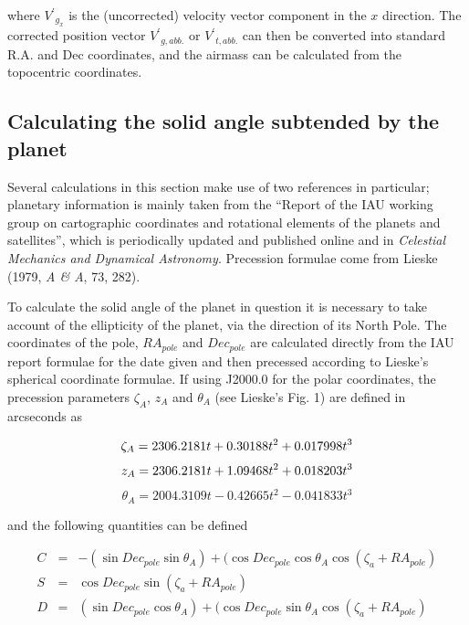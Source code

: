 \documentclass[11pt,twoside]{starlink}
\begin{document}
where ${V^\prime}_{g_{\dot{x}}}$ is the (uncorrected) velocity vector component in the $x$ direction.  The corrected position vector ${V^\prime}_{g, abb.}$ or ${V^\prime}_{t, abb.}$ can then be converted into standard R.A. and Dec coordinates, and the airmass can be calculated from the topocentric coordinates.

\subsection{Calculating the solid angle subtended by the planet}
\label{sec:solidangle}

Several calculations in this section make use of two references in particular; planetary information is mainly taken from the ``Report of the IAU working group on cartographic coordinates and rotational elements of the planets and satellites'', which is periodically updated and published online and in \emph{Celestial Mechanics and Dynamical Astronomy}.  Precession formulae come from Lieske (1979, \textit{A \& A}, 73, 282).

To calculate the solid angle of the planet in question it is necessary to take account of the ellipticity of the planet, via the direction of its North Pole.  The coordinates of the pole, $RA_{pole}$ and $Dec_{pole}$ are calculated directly from the IAU report formulae for the date given and then precessed according to Lieske's spherical coordinate formulae.  If using J2000.0 for the polar coordinates, the precession parameters $\zeta_A$, $z_A$ and $\theta_A$ (see Lieske's Fig. 1) are defined in arcseconds as

\begin{displaymath}
\zeta_A = 2306.2181 t + 0.30188 {t^2} + 0.017998 {t^3}\\
\end{displaymath}
\begin{displaymath}
z_A = 2306.2181 t + 1.09468 {t^2} + 0.018203 {t^3}\\
\end{displaymath}
\begin{displaymath}
\theta_A = 2004.3109 t - 0.42665 {t^2} - 0.041833 {t^3}
\end{displaymath}

and the following quantities can be defined

\begin{eqnarray*}
C & = & -(\sin Dec_{pole} \sin \theta_A) + (\cos Dec_{pole} \cos \theta_A \cos (\zeta_a + RA_{pole})\\
S & = & \cos Dec_{pole} \sin (\zeta_a + RA_{pole})\\
D & = & (\sin Dec_{pole} \cos \theta_A) + (\cos Dec_{pole} \sin \theta_A \cos (\zeta_a + RA_{pole})
\end{eqnarray*}
\end{document}
